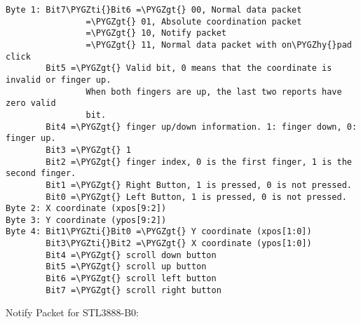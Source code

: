 \documentclass[a4paper,8pt,english]{sphinxmanual}
\def\PYGZgt{\char`\>}
\def\PYGZhy{\char`\-}
\def\PYGZti{\char`\~}
\begin{document}
\begin{Verbatim}[commandchars=\\\{\}]
Byte 1: Bit7\PYGZti{}Bit6 =\PYGZgt{} 00, Normal data packet
                =\PYGZgt{} 01, Absolute coordination packet
                =\PYGZgt{} 10, Notify packet
                =\PYGZgt{} 11, Normal data packet with on\PYGZhy{}pad click
        Bit5 =\PYGZgt{} Valid bit, 0 means that the coordinate is invalid or finger up.
                When both fingers are up, the last two reports have zero valid
                bit.
        Bit4 =\PYGZgt{} finger up/down information. 1: finger down, 0: finger up.
        Bit3 =\PYGZgt{} 1
        Bit2 =\PYGZgt{} finger index, 0 is the first finger, 1 is the second finger.
        Bit1 =\PYGZgt{} Right Button, 1 is pressed, 0 is not pressed.
        Bit0 =\PYGZgt{} Left Button, 1 is pressed, 0 is not pressed.
Byte 2: X coordinate (xpos[9:2])
Byte 3: Y coordinate (ypos[9:2])
Byte 4: Bit1\PYGZti{}Bit0 =\PYGZgt{} Y coordinate (xpos[1:0])
        Bit3\PYGZti{}Bit2 =\PYGZgt{} X coordinate (ypos[1:0])
        Bit4 =\PYGZgt{} scroll down button
        Bit5 =\PYGZgt{} scroll up button
        Bit6 =\PYGZgt{} scroll left button
        Bit7 =\PYGZgt{} scroll right button
\end{Verbatim}

Notify Packet for STL3888-B0:
\end{document}
